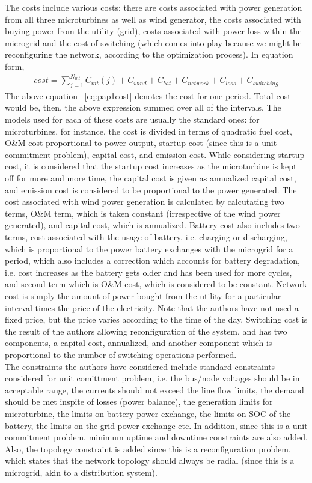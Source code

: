The costs include various costs: there are costs associated with power generation from all three microturbines as well as wind generator, the costs associated with buying power from the utility (grid), costs associated with power loss within the microgrid and the cost of switching (which comes into play because we might be reconfiguring the network, according to the optimization process). In equation form,
\begin{eqnarray}
\label{eq:pap1cost}
cost = \sum\limits_{j=1}^{N_{mt}}C_{mt}(j) + C_{wind} + C_{bat} + C_{network} + C_{loss} + C_{switching}
\end{eqnarray}
The above equation ~\eqref{eq:pap1cost} denotes the cost for one period. Total cost would be, then, the above expression summed over all of the intervals.
The models used for each of these costs are usually the standard ones: for microturbines, for instance, the cost is divided in terms of quadratic fuel cost, O\&M cost proportional to power output, startup cost (since this is a unit commitment problem), capital cost, and emission cost. While considering startup cost, it is considered that the startup cost increases as the microturbine is kept off for more and more time, the capital cost is given as annualized capital cost, and emission cost is considered to be proportional to the power generated.
The cost associated with wind power generation is calculated by calcutating two terms, O\&M term, which is taken constant (irrespective of the wind power generated), and capital cost, which is annualized. 
Battery cost also includes two terms, cost associated with the usage of battery, i.e. charging or discharging, which is proportional to the power battery exchanges with the microgrid for a period, which also includes a correction which accounts for battery degradation, i.e. cost increases as the battery gets older and has been used for more cycles, and second term which is O\&M cost, which is considered to be constant. 
Network cost is simply the amount of power bought from the utility for a particular interval times the price of the electricity. Note that the authors have not used a fixed price, but the price varies according to the time of the day. 
Switching cost is the result of the authors allowing reconfiguration of the system, and has two components, a capital cost, annualized, and another component which is proportional to the number of switching operations performed.\\
The constraints the authors have considered include standard constraints considered for unit comittment problem, i.e. the bus/node voltages should be in acceptable range, the currents should not exceed the line flow limits, the demand should be met inspite of losses (power balance), the generation limits for microturbine, the limits on battery power exchange, the limits on SOC of the battery, the limits on the grid power exchange etc. In addition, since this is a unit commitment problem, minimum uptime and downtime constraints are also added. Also, the topology constraint is added since this is a reconfiguration problem, which states that the network topology should always be radial (since this is a microgrid, akin to a distribution system).




